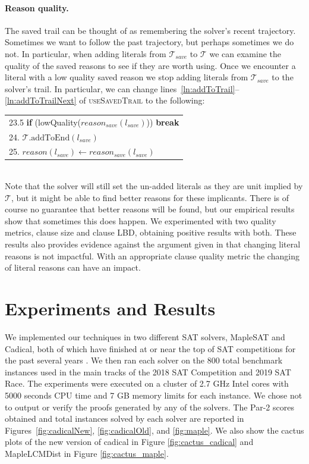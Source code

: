\documentclass[runningheads]{llncs}
\newcommand{\trail}{\ensuremath{\mathcal{T}}}
\newcommand{\reason}[1]{\ensuremath{\mathit{reason}(#1)}}
\newcommand{\reasonsave}[1]{\ensuremath{\mathit{reason_{\mathit{save}}(#1)}}}
\newcommand{\litsave}{\ensuremath{\mathit{l_{\mathit{save}}}}}
\newcommand{\trailsave}{\trail_{\mathit{save}}}
\newcommand{\ust}{\textsc{useSavedTrail}\xspace}
\begin{document}
\paragraph{Reason quality.}
The saved trail can be thought of as remembering the solver's recent
trajectory. Sometimes we want to follow the past trajectory, but
perhaps sometimes we do not. In particular, when adding literals from
$\trailsave{}$ to $\trail$ we can examine the quality of the saved
reasons to see if they are worth using. Once we encounter a literal
with a low quality saved reason we stop adding literals from
$\trailsave$ to the solver's trail. In particular, we can change
lines~\ref{ln:addToTrail}--\ref{ln:addToTrailNext} of \ust
to the following:\\[5pt]
\begin{tabular}[t]{l}
23.5 \qquad \textbf{if} (lowQuality($\reasonsave{\litsave}$)) \textbf{break}\\
24.  \qquad $\trail.\mathrm{addToEnd(\litsave)}$\\
25.  \qquad $\reason{\litsave}\gets \reasonsave{\litsave}$
\end{tabular}\\[5pt]

Note that the solver will still set the un-added literals as they are
unit implied by $\trail$, but it might be able to find better reasons
for these implicants. There is of course no guarantee that better
reasons will be found, but our empirical results show that sometimes
this does happen. We experimented with two quality metrics, clause
size and clause LBD, obtaining positive results with both. These
results also provides evidence against the argument given in
\cite{DBLP:journals/jsat/TakRH11} that changing literal reasons is not
impactful. With an appropriate clause quality metric the changing of literal
reasons can have an impact.

\section{Experiments and Results}
We implemented our techniques in two different SAT solvers, MapleSAT
and Cadical, both of which have finished at or near the top of SAT
competitions for the past several years
\cite{Heule2018ProceedingsOS,Heule2019ProceedingsOS}. We then ran each
solver on the 800 total benchmark instances used in the main tracks of
the 2018 SAT Competition and 2019 SAT Race. The experiments were executed on a
cluster of 2.7 GHz Intel cores with 5000 seconds CPU time and 7 GB
memory limits for each instance. We chose not to output or verify the
proofs generated by any of the solvers. The Par-2 scores obtained and
total instances solved by each solver are reported in
Figures~\ref{fig:cadicalNew}, \ref{fig:cadicalOld}, and
\ref{fig:maple}. We also show the cactus plots of the new version of
cadical in Figure \ref{fig:cactus_cadical} and MapleLCMDist in Figure
\ref{fig:cactus_maple}.
\end{document}
